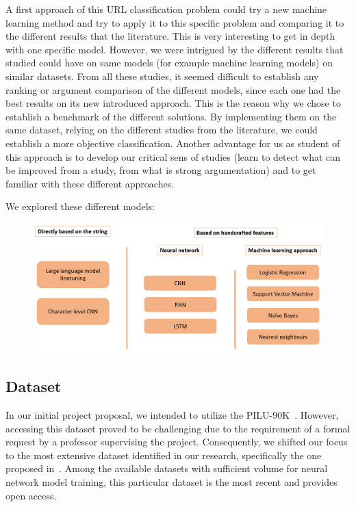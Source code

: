 \documentclass{article}
\begin{document}
    A first approach of this URL classification problem could try a new machine learning method and try to apply it to this specific problem and comparing it to the different results that the literature.
    This is very interesting to get in depth with one specific model.
    However, we were intrigued by the different results that studied could have on same models (for example machine learning models) on similar datasets.
    From all these studies, it seemed difficult to establish any ranking or argument comparison of the different models, since each one had the best results on its new introduced approach.
    This is the reason why we chose to establish a benchmark of the different solutions.
    By implementing them on the same dataset, relying on the different studies from the literature, we could establish a more objective classification.
    Another advantage for us as student of this approach is to develop our critical sens of studies (learn to detect what can be improved from a study, from what is strong argumentation) and to get familiar with these different approaches.

    We explored these different models:
    \begin{figure}[H]
        \centering
        \includegraphics[width=\linewidth]{report_img/modelspresentation}
        \caption{}
        \label{fig:model_presentation}
    \end{figure}


    \subsection{Dataset}\label{sec:dataset}
    In our initial project proposal, we intended to utilize the PILU-90K~\cite{PhishingURLDetection}. However, accessing this dataset proved to be challenging due to the requirement of a formal request by a professor supervising the project. Consequently, we shifted our focus to the most extensive dataset identified in our research, specifically the one proposed in~\cite{VisualizingRNNInURLDetection}. Among the available datasets with sufficient volume for neural network model training, this particular dataset is the most recent and provides open access.
\end{document}
